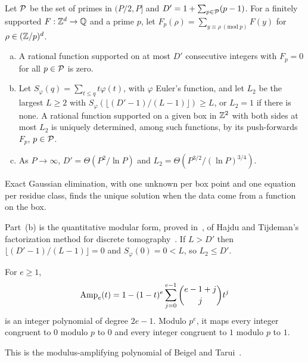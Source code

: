 \begin{imported}\label{imp:window}
Let \(\mathcal P\) be the set of primes in \((P/2,P]\) and
\(D'=1+\sum_{p\in\mathcal P}(p-1)\). For a finitely supported
\(F:\mathbb Z^d\to\mathbb Q\) and a prime \(p\), let
\(F_p(\rho)=\sum_{y\equiv\rho\ (\mathrm{mod}\ p)}F(y)\) for
\(\rho\in(\mathbb Z/p)^d\).
\begin{enumerate}[(a)]
\item A rational function supported on at most \(D'\) consecutive
integers with \(F_p=0\) for all \(p\in\mathcal P\) is zero.
\item Let \(S_\varphi(q)=\sum_{t\le q}t\varphi(t)\), with \(\varphi\)
Euler's function, and let \(L_2\) be the largest \(L\ge2\) with
\(S_\varphi(\lfloor(D'-1)/(L-1)\rfloor)\ge L\), or \(L_2=1\) if there is
none. A rational function supported on a given box in \(\mathbb Z^2\) with
both sides at most \(L_2\) is uniquely determined, among such
functions, by its push-forwards \(F_p\), \(p\in\mathcal P\).
\item As \(P\to\infty\), \(D'=\Theta(P^2/\ln P)\) and
\(L_2=\Theta(P^{3/2}/(\ln P)^{3/4})\).
\end{enumerate}
Exact Gaussian elimination, with one unknown per box point and one
equation per residue class, finds the unique solution when the data
come from a function on the box.
\end{imported}

Part~(b) is the quantitative modular form, proved
in~\cite{NagCG}, of Hajdu and Tijdeman's factorization method for
discrete tomography~\cite[Theorem~1]{HT01}. If \(L>D'\) then
\(\lfloor(D'-1)/(L-1)\rfloor=0\) and \(S_\varphi(0)=0<L\), so
\(L_2\le D'\).

\begin{imported}[{\cite[Section~2.3]{BT94}}]\label{imp:amp}
For \(e\ge1\),
\[\mathrm{Amp}_e(t)=1-(1-t)^e\sum_{j=0}^{e-1}\binom{e-1+j}jt^j\]
is an integer polynomial of degree \(2e-1\). Modulo \(p^e\), it maps
every integer congruent to \(0\) modulo \(p\) to \(0\) and every integer
congruent to \(1\) modulo \(p\) to \(1\).
\end{imported}

This is the modulus-amplifying polynomial of Beigel and
Tarui~\cite[Section~2.3]{BT94}.

